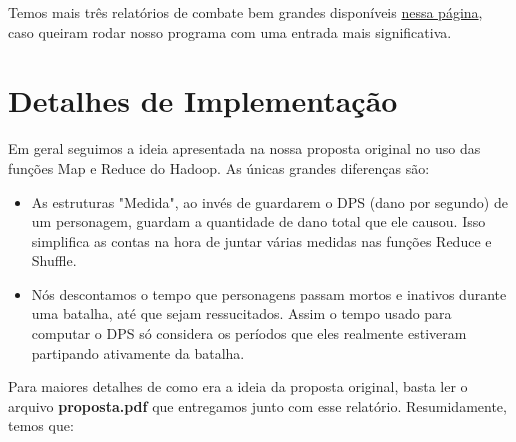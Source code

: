 \documentclass[a4paper,11pt]{article}
\begin{document}
  Temos mais três relatórios de combate bem grandes disponíveis
  \href{http://www.linux.ime.usp.br/~gorobaum/logs/}{nessa página}, caso queiram
  rodar nosso programa com uma entrada mais significativa.
  
\section{Detalhes de Implementação}

  Em geral seguimos a ideia apresentada na nossa proposta original no uso das
  funções Map e Reduce do Hadoop. As únicas grandes diferenças são:
  
  \begin{itemize}
    \item
      As estruturas "Medida", ao invés de guardarem o DPS (dano por segundo) de
      um personagem, guardam a quantidade de dano total que ele causou. Isso
      simplifica as contas na hora de juntar várias medidas nas funções Reduce e
      Shuffle.
    \item
      Nós descontamos o tempo que personagens passam mortos e inativos durante
      uma batalha, até que sejam ressucitados. Assim o tempo usado para computar
      o DPS só considera os períodos que eles realmente estiveram partipando
      ativamente da batalha.
  \end{itemize}    
  
  Para maiores detalhes de como era a ideia da proposta original, basta ler o
  arquivo \textbf{proposta.pdf} que entregamos junto com esse relatório.
  Resumidamente, temos que:
  
\end{document}
